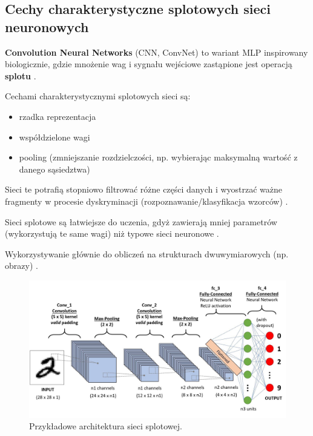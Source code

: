 \documentclass[wi]{zut}
\begin{document}


\subsection{Cechy charakterystyczne splotowych sieci neuronowych}

\textbf{Convolution Neural Networks} (CNN, ConvNet) to wariant MLP inspirowany biologicznie, gdzie mnożenie wag i sygnału wejściowe zastąpione jest operacją \textbf{splotu} \cite{Forczmanski2020}.

Cechami charakterystycznymi splotowych sieci są:

\begin{itemize}
    \item rzadka reprezentacja
    \item współdzielone wagi
    \item pooling (zmniejszanie rozdzielczości, np. wybierając maksymalną wartość z danego sąsiedztwa)
\end{itemize}

Sieci te potrafią stopniowo filtrować różne części danych i wyostrzać ważne fragmenty w procesie dyskryminacji (rozpoznawanie/klasyfikacja wzorców) \cite{Forczmanski2020}.

Sieci splotowe są łatwiejsze do uczenia, gdyż zawierają mniej parametrów (wykorzystują te same wagi) niż typowe sieci neuronowe \cite{Forczmanski2020}. 

Wykorzystywanie głównie do obliczeń na strukturach dwuwymiarowych (np. obrazy) \cite{Forczmanski2020}.

\begin{figure}[H]
    \centering
    \includegraphics[width=0.7\linewidth]{images/cnn.jpeg}
    \caption{Przykładowe architektura sieci splotowej.}
    \label{fig:cnn}
\end{figure}
\end{document}
